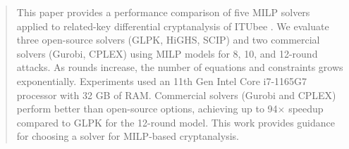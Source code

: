 \begin{abstract}

This paper provides a performance comparison of five MILP solvers applied to related-key differential cryptanalysis of ITUbee \cite{karakoc2013itubee}. We evaluate three open-source solvers (GLPK, HiGHS, SCIP) and two commercial solvers (Gurobi, CPLEX) using MILP models for 8, 10, and 12-round attacks. As rounds increase, the number of equations and constraints grows exponentially. Experiments used an 11th Gen Intel Core i7-1165G7 processor with 32 GB of RAM. Commercial solvers (Gurobi and CPLEX) perform better than open-source options, achieving up to 94$\times$ speedup compared to GLPK for the 12-round model. This work provides guidance for choosing a solver for MILP-based cryptanalysis.


\end{abstract}
